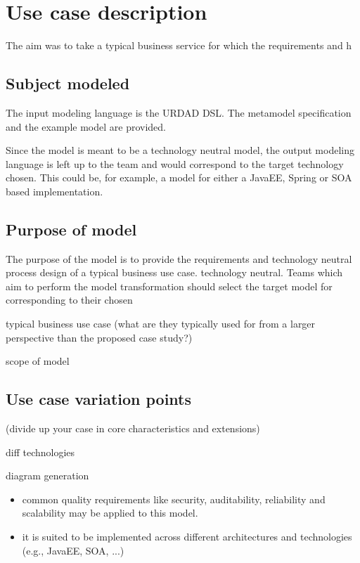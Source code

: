 \section{Use case description}

The aim was to take a typical business service for which the requirements and h

\subsection{Subject modeled}

The input modeling language is the URDAD DSL. The metamodel specification and the example model are provided.

Since the model is meant to be a technology neutral model, the output modeling language is left up to the team and would correspond to the target technology chosen. This could be, for example, a model for either a JavaEE, Spring or SOA based implementation.

\subsection{Purpose of model}

The purpose of the model is to provide the requirements and technology neutral process design of a typical business use case. 
technology neutral. Teams which aim to perform the model transformation should select the target model for corresponding to their chosen

typical business use case
            (what are they typically used for from a larger perspective than the proposed case study?)

scope of model

\subsection{Use case variation points}
      (divide up your case in core characteristics and extensions)

diff technologies

diagram generation
\begin{itemize}
      \item common quality requirements like security, auditability, reliability and scalability may be applied to this model.
      \item it is suited to be implemented across different architectures and technologies (e.g., JavaEE, SOA, ...)
\end{itemize}